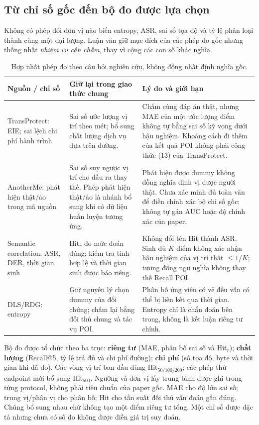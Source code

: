 \subsection{Từ chỉ số gốc đến bộ đo được lựa chọn}

Không có phép đổi đơn vị nào biến entropy, ASR, sai số tọa độ và tỷ lệ phân loại thành cùng một đại lượng. Luận văn giữ mục đích của các phép đo gốc nhưng thống nhất \emph{nhiệm vụ cần chấm}, thay vì cộng các con số khác nghĩa.

\begingroup\small{}
\begin{longtable}{P{3.0cm}P{5.1cm}P{6.25cm}}
\caption{Hợp nhất phép đo theo câu hỏi nghiên cứu, không đồng nhất định nghĩa gốc.}\label{tab:metric-decisions}\\
\toprule\textbf{Nguồn / chỉ số} & \textbf{Giữ lại trong giao thức chung} & \textbf{Lý do và giới hạn}\\\midrule\endhead
TransProtect: EIE; sai lệch chi phí hành trình~\cite{yadav2024transprotect}
& Sai số ước lượng vị trí theo mét; bổ sung chất lượng dịch vụ dựa trên đường.
& Chấm cùng đáp án thật, nhưng MAE của một ước lượng điểm không tự bằng sai số kỳ vọng dưới hậu nghiệm. Khoảng cách đi thêm của kết quả POI không phải công thức (13) của TransProtect.\\\midrule
AnotherMe: phát hiện thật/ảo trong mã nguồn~\cite{anothermecode}
& Sai số suy ngược vị trí cho đầu ra thay thế. Phép phát hiện thật/ảo là nhánh bổ sung khi có dữ liệu huấn luyện tương ứng.
& Phát hiện được dummy không đồng nghĩa định vị được người thật. Chưa xác minh đủ toàn văn để điền chính xác bộ chỉ số gốc; không tự gán AUC hoặc độ chính xác của paper.\\\midrule
Semantic correlation: ASR, DER, thời gian sinh~\cite{liu2026semantic}
& Hit$_r$ đo mức đoán đúng; kiểm tra tính hợp lệ và thời gian sinh được báo riêng.
& Không đổi tên Hit thành ASR. Sinh đủ $K$ điểm không xác nhận hậu nghiệm của vị trí thật $\leq1/K$; tương đồng ngữ nghĩa không thay thế Recall POI.\\\midrule
DLS/RDG: entropy~\cite{niu2014dls,shaham2021viterbi}
& Giữ nguyên lý chọn dummy của đối chứng; chấm lại bằng đối thủ chung và tác vụ POI.
& Phân bố ứng viên có vẻ đều vẫn có thể bị liên kết qua thời gian. Entropy chỉ là chẩn đoán bên trong, không là kết luận riêng tư chính.\\
\bottomrule
\end{longtable}\endgroup

Bộ đo được tổ chức theo ba trục: \textbf{riêng tư} (MAE, phân bố sai số và Hit$_r$); \textbf{chất lượng} (Recall@5, tỷ lệ trả đủ và chi phí đường); \textbf{chi phí} (số tọa độ, byte và thời gian khi đã đo). Các vòng vị trí ban đầu dùng Hit$_{50/100/200}$; các phép thử endpoint mới bổ sung Hit$_{500}$. Ngưỡng và đơn vị lấy trung bình được ghi trong từng protocol, không phải tiêu chuẩn của paper gốc. MAE cho độ lớn sai số; trung vị/phân vị cho phân bố; Hit cho tần suất đối thủ vẫn đoán gần đúng. Chúng bổ sung nhau chứ không tạo một điểm riêng tư tổng. Một chỉ số được đặc tả nhưng chưa có số đo không được điền giá trị suy đoán.

